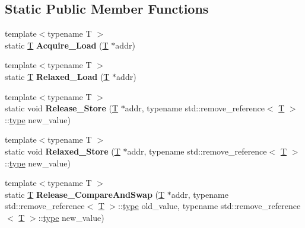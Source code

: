 \subsection*{Static Public Member Functions}
\begin{DoxyCompactItemize}
\item 
\mbox{\label{classv8_1_1base_1_1AsAtomicImpl_a776bcde4b303aceccd6491599a7cf1d5}} 
{\footnotesize template$<$typename T $>$ }\\static \mbox{\hyperlink{classv8_1_1internal_1_1torque_1_1T}{T}} {\bfseries Acquire\+\_\+\+Load} (\mbox{\hyperlink{classv8_1_1internal_1_1torque_1_1T}{T}} $\ast$addr)
\item 
\mbox{\label{classv8_1_1base_1_1AsAtomicImpl_ae17a848e6e9140dda698d2f1395d6cff}} 
{\footnotesize template$<$typename T $>$ }\\static \mbox{\hyperlink{classv8_1_1internal_1_1torque_1_1T}{T}} {\bfseries Relaxed\+\_\+\+Load} (\mbox{\hyperlink{classv8_1_1internal_1_1torque_1_1T}{T}} $\ast$addr)
\item 
\mbox{\label{classv8_1_1base_1_1AsAtomicImpl_a34e2a63266f7f9ad03907c218e97eb47}} 
{\footnotesize template$<$typename T $>$ }\\static void {\bfseries Release\+\_\+\+Store} (\mbox{\hyperlink{classv8_1_1internal_1_1torque_1_1T}{T}} $\ast$addr, typename std\+::remove\+\_\+reference$<$ \mbox{\hyperlink{classv8_1_1internal_1_1torque_1_1T}{T}} $>$\+::\mbox{\hyperlink{classstd_1_1conditional_1_1type}{type}} new\+\_\+value)
\item 
\mbox{\label{classv8_1_1base_1_1AsAtomicImpl_a7d4a9ea0c0d495ee50668782992c067f}} 
{\footnotesize template$<$typename T $>$ }\\static void {\bfseries Relaxed\+\_\+\+Store} (\mbox{\hyperlink{classv8_1_1internal_1_1torque_1_1T}{T}} $\ast$addr, typename std\+::remove\+\_\+reference$<$ \mbox{\hyperlink{classv8_1_1internal_1_1torque_1_1T}{T}} $>$\+::\mbox{\hyperlink{classstd_1_1conditional_1_1type}{type}} new\+\_\+value)
\item 
\mbox{\label{classv8_1_1base_1_1AsAtomicImpl_a7f0822bfa029b3b16a629903973d539b}} 
{\footnotesize template$<$typename T $>$ }\\static \mbox{\hyperlink{classv8_1_1internal_1_1torque_1_1T}{T}} {\bfseries Release\+\_\+\+Compare\+And\+Swap} (\mbox{\hyperlink{classv8_1_1internal_1_1torque_1_1T}{T}} $\ast$addr, typename std\+::remove\+\_\+reference$<$ \mbox{\hyperlink{classv8_1_1internal_1_1torque_1_1T}{T}} $>$\+::\mbox{\hyperlink{classstd_1_1conditional_1_1type}{type}} old\+\_\+value, typename std\+::remove\+\_\+reference$<$ \mbox{\hyperlink{classv8_1_1internal_1_1torque_1_1T}{T}} $>$\+::\mbox{\hyperlink{classstd_1_1conditional_1_1type}{type}} new\+\_\+value)

\end{DoxyCompactItemize}
